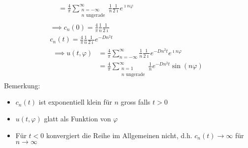 \begin{bsp*}
\begin{gather*}
\begin{split}
							&= \frac{4}{\pi} \sum_{\substack{n=-\infty \\ n \text{ ungerade}}}^\infty \frac{1}{n} \frac{1}{2\imath} e^{\imath n \varphi}
		\end{split} \\
		\implies c_n(0) = \frac{4}{\pi} \frac{1}{n} \frac{1}{2\imath} \\
		c_n(t) = \frac{4}{\pi} \frac{1}{n} \frac{1}{2\imath} e^{-D n^2 t} \\
		\begin{split}
			\implies u(t,\varphi)	&= \frac{4}{\pi} \sum_{n=-\infty}^{\infty} \frac{1}{n} \frac{1}{2\imath} e^{-D n^2 t} e^{\imath n \varphi} \\
							&= \frac{4}{\pi} \sum_{\substack{n=1 \\ n \text{ ungerade}}}^\infty \frac{1}{n} e^{-D n^2 t} \sin(n\varphi)
		\end{split}
	\end{gather*}
	Bemerkung:
	\begin{itemize}
		\item $c_n(t)$ ist exponentiell klein für $n$ gross falls $t > 0$
		\item $u(t,\varphi)$ glatt als Funktion von $\varphi$
		\item Für $t < 0$ konvergiert die Reihe im Allgemeinen nicht, d.h. $c_n(t) \rightarrow \infty$ für $n \rightarrow \infty$
	\end{itemize}
\end{bsp*}

